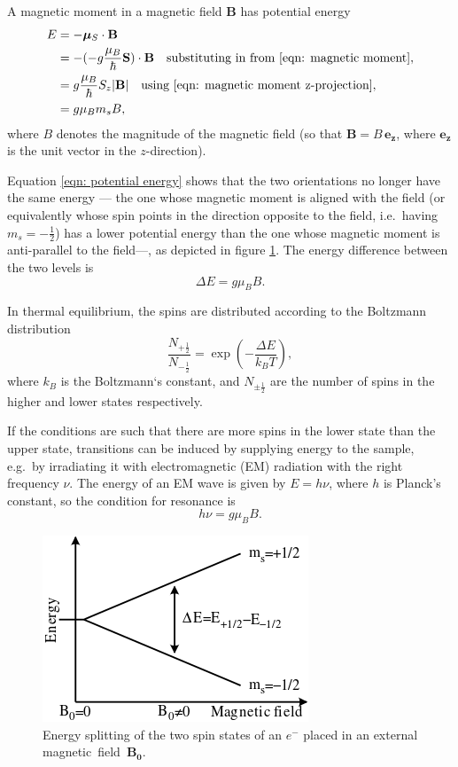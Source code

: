 \documentclass[a4paper]{jpconf}
\numberwithin{equation}{section}
\begin{document}
A magnetic moment in a magnetic field $\mathbf{B}$ has potential energy
\begin{align}
	E &= - \bm{\mu}_S \cdot \mathbf{B} \nonumber \\
	  &= - (- g \frac{\mu_B}{\hbar} \mathbf{S})\cdot\mathbf{B} \quad \text{substituting in from \eqref{eqn: magnetic moment}}, \nonumber \\
	  &= g \frac{\mu_B}{\hbar}S_z \lvert \mathbf{B} \rvert \quad \text{using \eqref{eqn: magnetic moment z-projection}}, \nonumber \\
	  &= g\mu_Bm_sB \label{eqn: potential energy},
\end{align}
where $B$ denotes the magnitude of the magnetic field (so that $\mathbf{B} = B \, \mathbf{e_z}$, where $\mathbf{e_z}$ is the unit vector in the $z$-direction).

Equation \eqref{eqn: potential energy} shows that the two orientations no longer have the same energy --- the one whose magnetic moment is aligned with the field (or equivalently whose spin points in the direction opposite to the field, i.e.\ having $m_s = -\tfrac12$) has a lower potential energy than the one whose magnetic moment is anti-parallel to the field---, as depicted in figure \ref{fig: energy splitting}. The energy difference between the two levels is 
\begin{equation}
	\Delta E = g \mu_B B. \label{eqn: energy difference}
\end{equation}

In thermal equilibrium, the spins are distributed according to the Boltzmann distribution
\[
    \frac{N_{+\tfrac12}}{N_{-\tfrac12}} = \exp(- \frac{\Delta E}{k_B T}),
\]
where $k_B$ is the Boltzmann\textquoteleft s constant, and $N_{\pm\tfrac12}$ are the number of spins in the higher and lower states respectively. 

If the conditions are such that there are more spins in the lower state than the upper state, transitions can be induced by supplying energy to the sample, e.g.\ by irradiating it with electromagnetic (EM) radiation with the right frequency $\nu$. The energy of an EM wave is given by $E = h \nu$, where $h$ is Planck's constant, so the condition for resonance is
\begin{equation}
	h\nu = g\mu_B B. \label{eqn: resonance condition}
\end{equation}

\begin{figure}[htbp]
	\includegraphics{EPR_splitting.png}
	\caption{Energy splitting of the two spin states of an $e^-$ placed in an external magnetic~field~$\mathbf{B_0}$.}
	\label{fig: energy splitting}
\end{figure}
\end{document}
